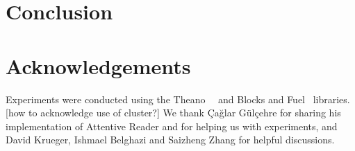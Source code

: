 \documentclass{article} %
\begin{document}
\section{Conclusion}

\section*{Acknowledgements}

Experiments were conducted using the Theano~\cite{theano1}~\cite{theano2} and Blocks and Fuel~\cite{blocks} libraries.
[how to acknowledge use of cluster?]
We thank Çağlar Gülçehre for sharing his implementation of Attentive Reader and for helping us with experiments,
and David Krueger, Ishmael Belghazi and Saizheng Zhang for helpful discussions.



\end{document}
